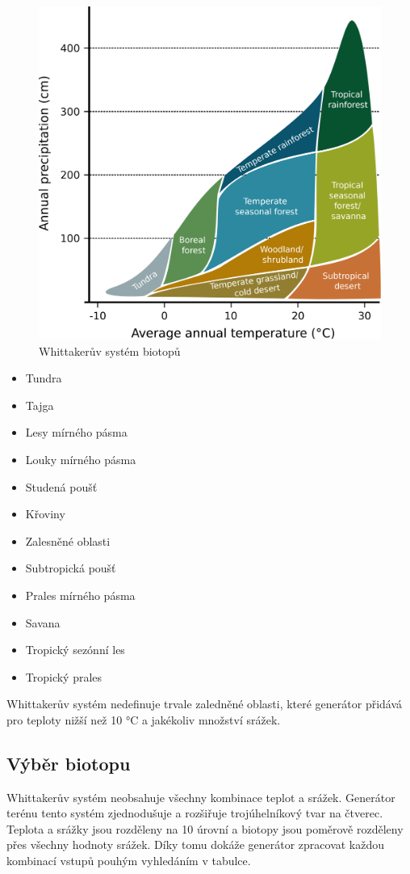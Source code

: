 \documentclass[thesis=M,czech]{FITthesis}[2019/12/23]
\begin{document}
\begin{figure}\centering
	\includegraphics[width=\textwidth]{images/world_gen/whitt_biomes}
	\caption[Whittakerův systém biotopů]{Whittakerův systém biotopů~\cite{whitt_image}}\label{fig:whitt_biomes}
\end{figure}

\begin{itemize}
\item Tundra
\item Tajga
\item Lesy mírného pásma
\item Louky mírného pásma
\item Studená poušť
\item Křoviny
\item Zalesněné oblasti
\item Subtropická poušť
\item Prales mírného pásma
\item Savana
\item Tropický sezónní les
\item Tropický prales
\end{itemize}

Whittakerův systém nedefinuje trvale zaledněné oblasti, které generátor přidává pro teploty nižší než 10 °C a jakékoliv množství srážek.

\subsection{Výběr biotopu}
Whittakerův systém neobsahuje všechny kombinace teplot a srážek. Generátor terénu tento systém zjednodušuje a rozšiřuje trojúhelníkový tvar na čtverec. Teplota a srážky jsou rozděleny na 10 úrovní a biotopy jsou poměrově rozděleny přes všechny hodnoty srážek. Díky tomu dokáže generátor zpracovat každou kombinací vstupů pouhým vyhledáním v tabulce.
\end{document}
